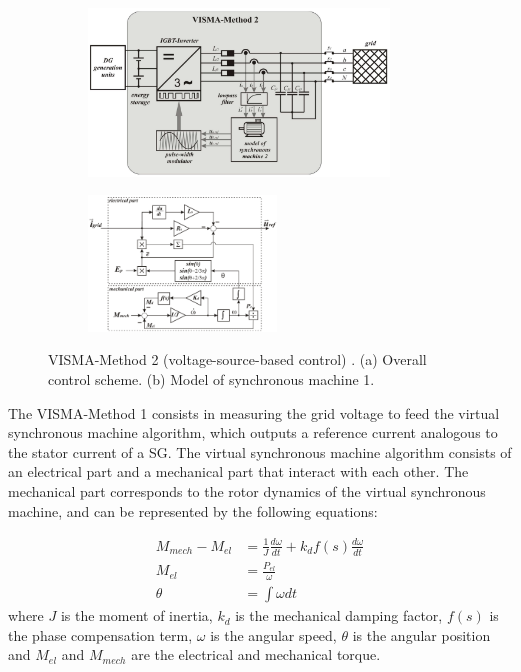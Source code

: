 \begin{figure}[h!]
    \centering
    \begin{subfigure}[b]{\textwidth}
        \centering
        \includegraphics[width=8cm]{images/VISMA2Concept.png}
        \caption{}
        \label{fig:VISMA2Concept}
    \end{subfigure}

    \begin{subfigure}[b]{\textwidth}
        \centering
        \includegraphics[width=5cm]{images/VISMA2block.png}
        \caption{}
        \label{fig:VISMA2block}
    \end{subfigure}
    \label{fig:VISMA2}
    \caption{VISMA-Method 2 (voltage-source-based control) \cite{chen2012comparison}. (a) Overall control scheme. (b) Model of synchronous machine 1.}
\end{figure}

\newpage
The VISMA-Method 1 consists in measuring the grid voltage to feed the virtual
synchronous machine algorithm, which outputs a reference current analogous to
the stator current of a SG. The virtual synchronous machine algorithm consists
of an electrical part and a mechanical part that interact with each other. The
mechanical part corresponds to the rotor dynamics of the virtual synchronous
machine, and can be represented by the following equations:

\begin{equation*}
    \begin{aligned}
        M_{mech} - M_{el} &= \frac{1}{J} \frac{d\omega}{dt} + k_d f(s) \frac{d\omega}{dt}\\
        M_{el} &= \frac{P_{el}}{\omega}\\
        \theta &= \int \omega dt
    \end{aligned}
\end{equation*}
\noindent where $J$ is the moment of inertia, $k_d$ is the mechanical damping
factor, $f(s)$ is the phase compensation term, $\omega$ is the angular speed,
$\theta$ is the angular position and $M_{el}$ and $M_{mech}$ are the electrical
and mechanical torque.

